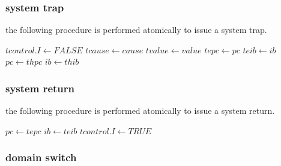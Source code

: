 \newpage
\subsubsection{system trap}

\par\noindent
the following procedure is performed atomically to issue a system trap.

\begin{algorithm}[H]
\footnotesize
\caption{execute system trap handler}
\begin{algorithmic}[1]
    \State $\mathit{tcontrol.I} \gets \mathit{FALSE}$
    \State $\mathit{tcause} \gets \mathit{cause}$
    \State $\mathit{tvalue} \gets \mathit{value}$
    \State $\mathit{tepc} \gets \mathit{pc}$
    \State $\mathit{teib} \gets \mathit{ib}$
    \State $\mathit{pc} \gets \mathit{thpc}$
    \State $\mathit{ib} \gets \mathit{thib}$
\EndFunction
\end{algorithmic}
\end{algorithm}

\subsubsection{system return}

\par\noindent
the following procedure is performed atomically to issue a system return.

\begin{algorithm}[H]
\footnotesize
\caption{return to the point of system exception}
\begin{algorithmic}[1]
    \State $\mathit{pc} \gets \mathit{tepc}$
    \State $\mathit{ib} \gets \mathit{teib}$
    \State $\mathit{tcontrol.I} \gets \mathit{TRUE}$
\EndFunction
\end{algorithmic}
\end{algorithm}

\subsubsection{domain switch}

